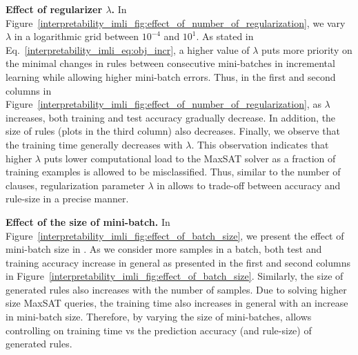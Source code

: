 \textbf{Effect of regularizer $ \lambda $.} In Figure~\ref{interpretability_imli_fig:effect_of_number_of_regularization}, we vary $ \lambda $ in a logarithmic grid between $ 10^{-4} $ and $ 10^1 $. As stated in Eq.~\eqref{interpretability_imli_eq:obj_incr}, a higher value of $ \lambda $ puts more priority on the minimal changes in rules between consecutive mini-batches in incremental learning while allowing higher mini-batch errors. Thus, in the first and second columns in Figure~\ref{interpretability_imli_fig:effect_of_number_of_regularization}, as $ \lambda $ increases, both training and test accuracy gradually decrease. In addition, the size of rules (plots in the third column) also decreases. Finally, we observe that the training time generally decreases with $ \lambda $. This observation indicates that higher $ \lambda $ puts lower computational load to the MaxSAT solver as a fraction of training examples is allowed to be misclassified. Thus, similar to the number of clauses, regularization parameter $ \lambda $ in {\imli} allows to trade-off between accuracy and rule-size in a precise manner.

\textbf{Effect of the size of mini-batch.} In Figure~\ref{interpretability_imli_fig:effect_of_batch_size}, we present the effect of mini-batch size in {\imli}. As we consider more samples in a batch, both test and training accuracy increase in general as presented in the first and second columns in Figure~\ref{interpretability_imli_fig:effect_of_batch_size}. Similarly, the size of generated rules also increases with the number of samples. Due to solving higher size MaxSAT queries, the training time also increases in general with an increase in mini-batch size. Therefore, by varying the size of mini-batches, {\imli} allows controlling on training time vs the prediction accuracy (and rule-size) of generated rules. 


